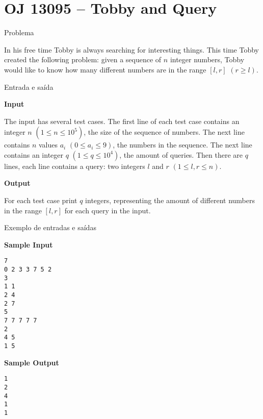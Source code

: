 \section{OJ 13095 -- Tobby and Query}

\begin{frame}[fragile]{Problema}

In his free time Tobby is always searching for interesting things. This time Tobby created the
following problem: given a sequence of $n$ integer numbers, Tobby would like to know how many
different numbers are in the range $[l, r]$ $(r\geq l)$.

\end{frame}

\begin{frame}[fragile]{Entrada e saída}

\textbf{Input}

The input has several test cases. The first line of each test case contains an integer $n$
$(1\leq n\leq 10^5)$, the size of the sequence of numbers. The next line contains $n$ values $a_i$
$(0\leq a_i\leq 9)$, the numbers in the sequence. The next line contains an integer $q$
$(1\leq q\leq 10^4)$, the amount of queries. Then there are $q$ lines, each line contains a query:
two integers $l$ and $r$ $(1\leq l, r\leq n)$.

\vspace{0.2in}

\textbf{Output}

For each test case print $q$ integers, representing the amount of different numbers in the range
$[l, r]$ for each query in the input.

\end{frame}

\begin{frame}[fragile]{Exemplo de entradas e saídas}

\begin{minipage}[t]{0.45\textwidth}
\textbf{Sample Input}
\begin{verbatim}
7
0 2 3 3 7 5 2
3
1 1
2 4
2 7
5
7 7 7 7 7
2
4 5
1 5
\end{verbatim}
\end{minipage}
\begin{minipage}[t]{0.5\textwidth}
\textbf{Sample Output}
\begin{verbatim}
1
2
4
1
1
\end{verbatim}
\end{minipage}
\end{frame}

